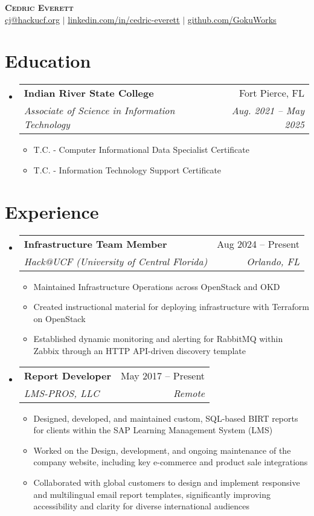 \documentclass[letterpaper,11pt]{article}
\makeatletter
\newcommand{\resumeItem}[1]{
  \item\small{
    {#1 \vspace{-2pt}}
  }
}
\newcommand{\resumeSubheading}[4]{
  \vspace{-2pt}\item
    \begin{tabular*}{0.97\textwidth}[t]{l@{\extracolsep{\fill}}r}
      \textbf{#1} & #2 \\
      \textit{\small#3} & \textit{\small #4} \\
    \end{tabular*}\vspace{-7pt}
}
\newcommand{\resumeSubHeadingListStart}{\begin{itemize}[leftmargin=0.15in, label={}]}
\newcommand{\resumeSubHeadingListEnd}{\end{itemize}}
\newcommand{\resumeItemListStart}{\begin{itemize}}
\newcommand{\resumeItemListEnd}{\end{itemize}\vspace{-5pt}}
\makeatother
\begin{document}
\begin{center}
    \textbf{\Huge \scshape Cedric Everett} \\ \vspace{1pt}
    \small \href{mailto:cj@hackucf.org}{\underline{cj@hackucf.org}} $|$ 
    \href{https://www.linkedin.com/in/cedric-everett/}{\underline{linkedin.com/in/cedric-everett}} $|$
    \href{https://github.com/GokuWorks}{\underline{github.com/GokuWorks}}
\end{center}


\section{Education}
  \resumeSubHeadingListStart
    \resumeSubheading
      {Indian River State College}{Fort Pierce, FL}
      {Associate of Science in Information Technology}{Aug. 2021 -- May 2025}
      \resumeItemListStart
        \resumeItem{T.C. - Computer Informational Data Specialist Certificate}
        \resumeItem{T.C. - Information Technology Support Certificate}
      \resumeItemListEnd
  \resumeSubHeadingListEnd


\section{Experience}
  \resumeSubHeadingListStart

    \resumeSubheading
      {Infrastructure Team Member}{Aug 2024 -- Present}
      {Hack@UCF (University of Central Florida)}{Orlando, FL}
      \resumeItemListStart
        \resumeItem{Maintained Infrastructure Operations across OpenStack and OKD}
        \resumeItem{Created instructional material for deploying infrastructure with Terraform on OpenStack}
        \resumeItem{Established dynamic monitoring and alerting for RabbitMQ within Zabbix through an HTTP API-driven discovery template}
      \resumeItemListEnd

    \resumeSubheading
        {Report Developer}{May 2017 -- Present}
        {LMS-PROS, LLC}{Remote}
        \resumeItemListStart
          \resumeItem{Designed, developed, and maintained custom, SQL-based BIRT reports for clients within the SAP Learning Management System (LMS)}
          \resumeItem{Worked on the Design, development, and ongoing maintenance of the company website, including key e-commerce and product sale integrations}
          \resumeItem{Collaborated with global customers to design and implement responsive and multilingual email report templates, significantly improving accessibility and clarity for diverse international audiences}
        \resumeItemListEnd
    \resumeSubHeadingListEnd
\end{document}
